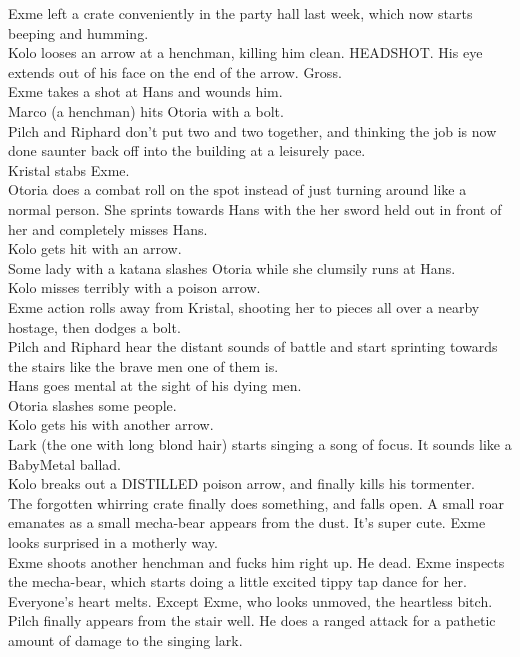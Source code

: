 Exme left a crate conveniently in the party hall last week, which now starts beeping and humming.\\
Kolo looses an arrow at a henchman, killing him clean. HEADSHOT. His eye extends out of his face on the end of the arrow. Gross.\\
Exme takes a shot at Hans and wounds him.\\
Marco (a henchman) hits Otoria with a bolt.\\
Pilch and Riphard don’t put two and two together, and thinking the job is now done saunter back off into the building at a leisurely pace.\\
Kristal stabs Exme.\\
Otoria does a combat roll on the spot instead of just turning around like a normal person. She sprints towards Hans with the her sword held out in front of her and completely misses Hans.\\
Kolo gets hit with an arrow.\\
Some lady with a katana slashes Otoria while she clumsily runs at Hans.\\
Kolo misses terribly with a poison arrow.\\
Exme action rolls away from Kristal, shooting her to pieces all over a nearby hostage, then dodges a bolt.\\
Pilch and Riphard hear the distant sounds of battle and start sprinting towards the stairs like the brave men one of them is.\\
Hans goes mental at the sight of his dying men.\\
Otoria slashes some people.\\
Kolo gets his with another arrow.\\
Lark (the one with long blond hair) starts singing a song of focus. It sounds like a BabyMetal ballad.\\
Kolo breaks out a DISTILLED poison arrow, and finally kills his tormenter.\\
The forgotten whirring crate finally does something, and falls open. A small roar emanates as a small mecha-bear appears from the dust. It’s super cute. Exme looks surprised in a motherly way.\\
Exme shoots another henchman and fucks him right up. He dead. Exme inspects the mecha-bear, which starts doing a little excited tippy tap dance for her. Everyone’s heart melts. Except Exme, who looks unmoved, the heartless bitch.\\
Pilch finally appears from the stair well. He does a ranged attack for a pathetic amount of damage to the singing lark.\\
